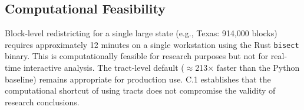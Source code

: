 \subsection{Computational Feasibility}

Block-level redistricting for a single large state (e.g., Texas:
914,000 blocks) requires approximately 12 minutes on a single workstation
using the Rust \texttt{bisect} binary. This is computationally feasible
for research purposes but not for real-time interactive analysis.
The tract-level default ($\approx$213$\times$ faster than the Python
baseline) remains appropriate for production use. C.1 establishes that
the computational shortcut of using tracts does not compromise the
validity of research conclusions.
